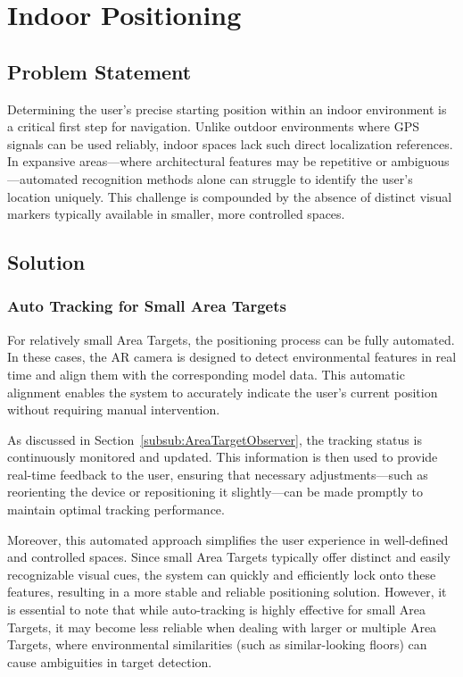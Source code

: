 \section{Indoor Positioning}
\subsection{Problem Statement}
Determining the user's precise starting position within an indoor environment is a critical first step for navigation. Unlike outdoor environments where GPS signals can be used reliably, indoor spaces lack such direct localization references. In expansive areas—where architectural features may be repetitive or ambiguous—automated recognition methods alone can struggle to identify the user's location uniquely. This challenge is compounded by the absence of distinct visual markers typically available in smaller, more controlled spaces.

\subsection{Solution}
\subsubsection{Auto Tracking for Small Area Targets}
For relatively small Area Targets, the positioning process can be fully automated. In these cases, the AR camera is designed to detect environmental features in real time and align them with the corresponding model data. This automatic alignment enables the system to accurately indicate the user's current position without requiring manual intervention.

As discussed in Section~\ref{subsub:AreaTargetObserver}, the tracking status is continuously monitored and updated. This information is then used to provide real-time feedback to the user, ensuring that necessary adjustments—such as reorienting the device or repositioning it slightly—can be made promptly to maintain optimal tracking performance.

Moreover, this automated approach simplifies the user experience in well-defined and controlled spaces. Since small Area Targets typically offer distinct and easily recognizable visual cues, the system can quickly and efficiently lock onto these features, resulting in a more stable and reliable positioning solution. However, it is essential to note that while auto-tracking is highly effective for small Area Targets, it may become less reliable when dealing with larger or multiple Area Targets, where environmental similarities (such as similar-looking floors) can cause ambiguities in target detection.

